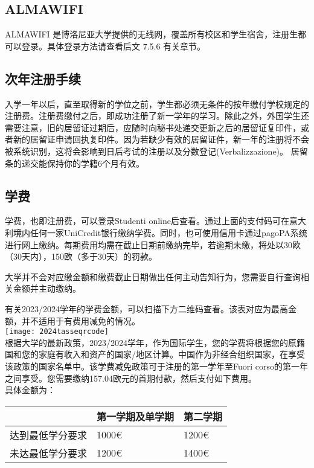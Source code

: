 \subsection{ALMAWIFI}
ALMAWIFI 是博洛尼亚大学提供的无线网，覆盖所有校区和学生宿舍，注册生都可以登录。具体登录方法请查看后文 7.5.6 有关章节。

\subsection{次年注册手续}
入学一年以后，直至取得新的学位之前，学生都必须无条件的按年缴付学校规定的注册费。注册费缴付之后，即成功注册了新一学年的学习。除此之外，外国学生还需要注意，旧的居留证过期后，应随时向秘书处递交更新之后的居留证复印件，或者新的居留证申请回执复印件。因为若缺少有效的居留证件，新一年的注册将不会被系统识别，这将会影响到日后考试的注册以及分数登记(Verbalizzazione)。 居留条的递交能保持你的学籍6个月有效。

\subsection{学费}
学费，也即注册费，可以登录Studenti online后查看。通过上面的支付码可在意大利境内任何一家UniCredit银行缴纳学费。同时，也可使用信用卡通过pagoPA系统进行网上缴纳。每期费用均需在截止日期前缴纳完毕，若逾期未缴，将处以30欧（30天内），150欧（多于30天）的罚款。 

大学并不会对应缴金额和缴费截止日期做出任何主动告知行为，您需要自行查询相关金额并主动缴纳。

有关2023/2024学年的学费金额，可以扫描下方二维码查看。该表对应为最高金额，并不适用于有费用减免的情况。\\

\texttt{[image: 2024tasseqrcode]}\\

根据大学的最新政策，2023/2024学年，作为国际学生，您的学费将根据您的原籍国和您的家庭有收入和资产的国家/地区计算。中国作为非经合组织国家，在享受该政策的国家名单中。该学费减免政策可于注册的第一学年至Fuori corso的第一年之间享受。您需要缴纳157.04欧元的首期付款，然后支付如下费用。\\
具体金额为：\\
\begin{tabularx}{\textwidth}{ |X|X|X| }
  \hline
   & 第一学期及单学期 & 第二学期\\
  \hline 
  达到最低学分要求  & 1000€ & 1200€  \\
  \hline 
  未达最低学分要求  & 1200€ & 1400€  \\
  \hline
\end{tabularx}


